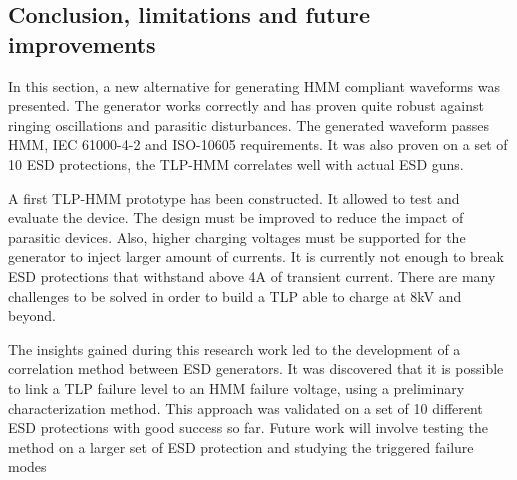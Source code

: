 \subsection{Conclusion, limitations and future improvements}

In this section, a new alternative for generating HMM compliant waveforms was presented.
The generator works correctly and has proven quite robust against ringing oscillations and parasitic disturbances.
The generated waveform passes HMM, IEC 61000-4-2 and ISO-10605 requirements.
It was also proven on a set of 10 ESD protections, the TLP-HMM correlates well with actual ESD guns.

A first TLP-HMM prototype has been constructed.
It allowed to test and evaluate the device.
The design must be improved to reduce the impact of parasitic devices.
Also, higher charging voltages must be supported for the generator to inject larger amount of currents.
It is currently not enough to break ESD protections that withstand above 4A of transient current.
There are many challenges to be solved in order to build a TLP able to charge at 8kV and beyond.

The insights gained during this research work led to the development of a correlation method between ESD generators.
It was discovered that it is possible to link a TLP failure level to an HMM failure voltage, using a preliminary characterization method.
This approach was validated on a set of 10 different ESD protections with good success so far.
Future work will involve testing the method on a larger set of ESD protection and studying the triggered failure modes
